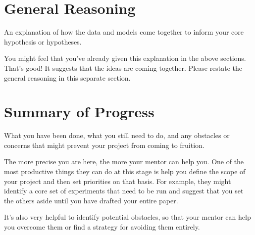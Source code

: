 \documentclass[11pt]{article}
\begin{document}
\section{General Reasoning} 

An explanation of how the data and models come together to inform your core hypothesis or hypotheses.

You might feel that you've already given this explanation in the above sections. That's good! It suggests that the ideas are coming together. Please restate the general reasoning in this separate section. 

\section{Summary of Progress} 

What you have been done, what you still need to do, and any obstacles or concerns that might prevent your project from coming to fruition.

The more precise you are here, the more your mentor can help you. One of the most productive things they can do at this stage is help you define the scope of your project and then set priorities on that basis. For example, they might identify a core set of experiments that need to be run and suggest that you set the others aside until you have drafted your entire paper.

It's also very helpful to identify potential obstacles, so that your mentor can help you overcome them or find a strategy for avoiding them entirely.

% 



\end{document}
